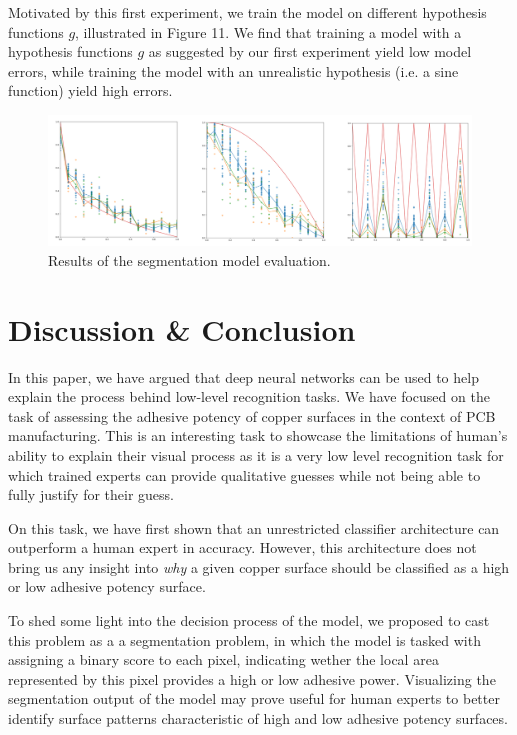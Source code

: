\documentclass[10pt,twocolumn,letterpaper]{article}
\begin{document}
Motivated by this first experiment, 
we train the model on different hypothesis functions $g$,
illustrated in Figure 11.
We find that training a model with a hypothesis functions $g$ as suggested by our first experiment
yield low model errors, while training the model with an unrealistic hypothesis (i.e. a sine function)
yield high errors. 

\begin{figure}[h]
	\centering
	\includegraphics[width=0.9\linewidth]{"./figures/Figure11"}
	\caption{
		Results of the segmentation model evaluation.
	}
\end{figure}

\section{Discussion \& Conclusion}

In this paper, we have argued that deep neural networks can be used to 
help explain the process behind low-level recognition tasks.
We have focused on the task of assessing the adhesive potency 
of copper surfaces in the context of PCB manufacturing.
This is an interesting task to showcase the limitations of human's ability to explain their visual process
as it is a very low level recognition task for which trained experts can provide qualitative guesses while
not being able to fully justify for their guess.

On this task, we have first shown that an unrestricted classifier 
architecture can outperform a human expert in accuracy.
However, this architecture does not bring us any insight 
into \textit{why} a given copper surface should be classified 
as a high or low adhesive potency surface.

To shed some light into the decision process of the model,
we proposed to cast this problem as a a segmentation problem, 
in which the model is tasked with assigning a binary score to each pixel,
indicating wether the local area represented by this pixel provides a high or low adhesive power.
Visualizing the segmentation output of the model may prove useful for 
human experts to better identify surface patterns characteristic of high and low 
adhesive potency surfaces.
\end{document}
